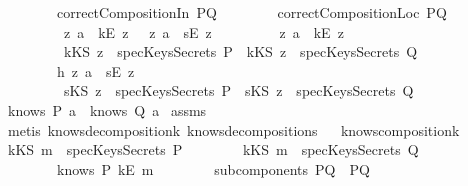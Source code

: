 \begin{isabellebody}
\ \ \ \ \ \ \ \ {\isachardoublequoteopen}correctCompositionIn\ PQ{\isachardoublequoteclose}\isanewline
\ \ \ \ \ \ \ \ {\isachardoublequoteopen}correctCompositionLoc\ PQ{\isachardoublequoteclose}\isanewline
\ \ \ \ \ \ \ \ {\isachardoublequoteopen}{\isacharparenleft}{\isasymexists}\ z{\isachardot}\ a\ {\isacharequal}\ kE\ z{\isacharparenright}\ {\isasymor}\ {\isacharparenleft}{\isasymexists}\ z{\isachardot}\ a\ {\isacharequal}\ sE\ z{\isacharparenright}{\isachardoublequoteclose}\isanewline
\ \ \ \ \ \ \ \ {\isachardoublequoteopen}{\isasymforall}\ z{\isachardot}\ a\ {\isacharequal}\ kE\ z\ {\isasymlongrightarrow}\ \isanewline
\ \ \ \ \ \ \ \ \ kKS\ z\ {\isasymnotin}\ specKeysSecrets\ P\ {\isasymand}\ kKS\ z\ {\isasymnotin}\ specKeysSecrets\ Q{\isachardoublequoteclose}\isanewline
\ \ \ \ \ \ \ \ h{}{\isacharcolon}{\isachardoublequoteopen}{\isasymforall}\ z{\isachardot}\ a\ {\isacharequal}\ sE\ z\ {\isasymlongrightarrow}\ \isanewline
\ \ \ \ \ \ \ \ \ sKS\ z\ {\isasymnotin}\ specKeysSecrets\ P\ {\isasymand}\ sKS\ z\ {\isasymnotin}\ specKeysSecrets\ Q{\isachardoublequoteclose}\isanewline
{}\ {\isachardoublequoteopen}knows\ P\ {\isacharbrackleft}a{\isacharbrackright}\ {\isasymor}\ knows\ Q\ {\isacharbrackleft}a{\isacharbrackright}{\isachardoublequoteclose}\isanewline
\isadelimproof
\endisadelimproof
\isatagproof
{}\isamarkupfalse \ assms\isanewline
{}\isamarkupfalse \ {\isacharparenleft}metis\ knows{\isacharunderscore}decomposition{\isacharunderscore}{}{\isacharunderscore}k\ knows{\isacharunderscore}decomposition{\isacharunderscore}{}{\isacharunderscore}s{\isacharparenright}\endisatagproof
{\isafoldproof}\isadelimproof
\ \isanewline
\endisadelimproof
\isanewline
{}\isamarkupfalse \ knows{\isacharunderscore}composition{}{\isacharunderscore}k{\isacharcolon}\isanewline
{}\ {\isachardoublequoteopen}{\isacharparenleft}kKS\ m{\isacharparenright}\ {\isasymnotin}\ specKeysSecrets\ P{\isachardoublequoteclose}\isanewline
\ \ \ \ \ \ \ \ {\isachardoublequoteopen}{\isacharparenleft}kKS\ m{\isacharparenright}\ {\isasymnotin}\ specKeysSecrets\ Q{\isachardoublequoteclose}\isanewline
\ \ \ \ \ \ \ \ {\isachardoublequoteopen}knows\ P\ {\isacharbrackleft}kE\ m{\isacharbrackright}{\isachardoublequoteclose}\isanewline
\ \ \ \ \ \ \ \ {\isachardoublequoteopen}subcomponents\ PQ\ {\isacharequal}\ {\isacharbraceleft}P{\isacharcomma}Q{\isacharbraceright}{\isachardoublequoteclose}\isanewline

\end{isabellebody}
